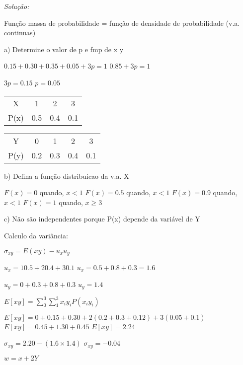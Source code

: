 \documentclass{article}
\newenvironment{solution}
    {\textit{Solução:}}
    {}
\begin{document}
\begin{solution}


Função massa de probabilidade = função de densidade de probabilidade (v.a. continuas)

a) Determine o valor de p e fmp de x y

$0.15 + 0.30 + 0.35 + 0.05 + 3p = 1$
$0.85 + 3p = 1$

$3p = 0.15$ 
$p = 0.05$


\begin{center}
\begin{tabular}{ |c|c|c|c|}
\hline

X & 1 & 2 & 3 \\
P(x) & 0.5 & 0.4 & 0.1 \\

 \hline
\end{tabular}
\end{center}

\begin{center}
\begin{tabular}{ |c|c|c|c|c|}
\hline

Y & 0 & 1 & 2 & 3  \\
P(y) & 0.2 & 0.3 & 0.4 & 0.1 \\

 \hline
\end{tabular}
\end{center}

b) Defina a função distribuicao da v.a. X

$F(x) = 0 $ quando, $x<1$
$F(x) = 0.5 $ quando, $x<1$
$F(x) = 0.9 $ quando, $x<1$
$F(x) = 1 $ quando, $x \geq 3$

c) Não são independentes porque P(x) depende da variável de Y

Calculo da variância:

$\sigma_{xy} = E(xy) - u_{x}u_{y}$

$u_{x} = 1 0.5 + 2 0.4 + 3 0.1$
$u_{x} = 0.5 + 0.8 + 0.3 = 1.6$

$u_{y} = 0 + 0.3 + 0.8 + 0.3$
$u_{y} = 1.4$

$E[xy] = \sum_{0}^{3}\sum_{1}^{3} x_{i}y_{i} P(x_{i}y_{i})$

$E[xy] = 0 + 0.15 + 0.30 + 2 (0.2+0.3+0.12)+3(0.05+0.1)$
$E[xy] = 0.45 + 1.30 + 0.45$
$E[xy] = 2.24$

$\sigma_{xy} = 2.20 - (1.6 \times 1.4)$
$\sigma_{xy} = -0.04$

$w= x + 2Y$

\begin{center}
\begin{tabular}{ |c|c|c|c|c|c|c|c|c|c|}
\hline


\end{tabular}
\end{center}
\end{solution}
\end{document}
